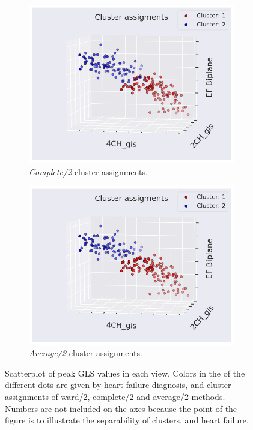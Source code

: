 \begin{figure}[htb]
    \begin{subfigure}[b]{0.49\textwidth}
        \centering
        \includegraphics[width=0.99\textwidth]{results/hf/scatter_gls_EF_complete2.png}
        \caption{\textit{Complete/2} cluster assignments.}
        \label{fig:scatter_gls_ef_complete2}
    \end{subfigure}
    \begin{subfigure}[b]{0.49\textwidth}
        \centering
        \includegraphics[width=0.99\textwidth]{results/hf/scatter_gls_EF_average2.png}
        \caption{\textit{Average/2} cluster assignments.}
        \label{fig:scatter_gls_ef_average2}
    \end{subfigure}
    \caption{Scatterplot of peak GLS values in each view. Colors in the of the different dots are given by heart failure diagnosis, and cluster assignments of 
             ward/2, complete/2 and average/2 methods. Numbers are not included on the axes because the point of the figure is to illustrate the separability 
             of clusters, and heart failure.}
             \label{fig:scatter_gls_ef_hf_cluster_assignments}
\end{figure}


